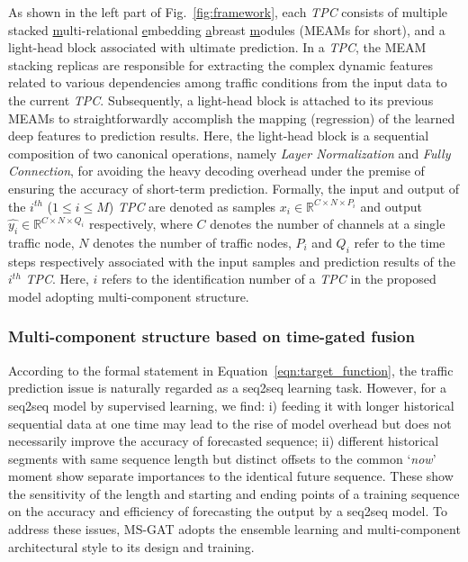 As shown in the left part of Fig.~\ref{fig:framework}, each \textit{TPC} consists of multiple stacked \underline{m}ulti-relational \underline{e}mbedding \underline{a}breast \underline{m}odules (MEAMs for short), and a light-head block associated with ultimate prediction. In a \textit{TPC}, the MEAM stacking replicas are responsible for extracting the complex dynamic features related to various dependencies among traffic conditions from the input data to the current \textit{TPC}. Subsequently, a light-head block is attached to its previous MEAMs to straightforwardly accomplish the mapping (regression) of the learned deep features to prediction results. Here, the light-head block is a sequential composition of two canonical operations, namely \textit{Layer Normalization} and \textit{Fully Connection}, for avoiding the heavy decoding overhead under the premise of ensuring the accuracy of short-term prediction. Formally, the input and output of the $i^{th}$ ($1 \leq i \leq \mathit{M}$) \textit{TPC} are  denoted as samples $x_i \in \mathbb{R}^{C \times N \times P_i}$ and output $\hat{y_i} \in \mathbb{R}^{C \times N \times Q_i}$ respectively, where $C$ denotes the number of channels at a single traffic node, $N$ denotes the number of traffic nodes, $P_i$ and $Q_i$ refer to the time steps respectively associated with the input samples and prediction results of the $i^{th}$ \textit{TPC}. Here, $i$ refers to the identification number of a \textit{TPC} in the proposed model adopting multi-component structure.  

\subsubsection{Multi-component structure based on time-gated fusion}

According to the formal statement in Equation~\ref{eqn:target_function}, the traffic prediction issue is naturally regarded as a seq2seq learning task. However, for a seq2seq model by supervised learning, we find: i) feeding it with longer historical sequential data at one time may lead to the rise of model overhead but does not necessarily improve the accuracy of forecasted sequence; ii) different historical segments with same sequence length but distinct offsets to the common ‘\textit{now}’ moment show separate importances to the identical future sequence. These show the sensitivity of the length and starting and ending points of a training sequence on the accuracy and efficiency of forecasting the output by a seq2seq model. To address these issues, MS-GAT adopts the ensemble learning and multi-component architectural style to its design and training.

